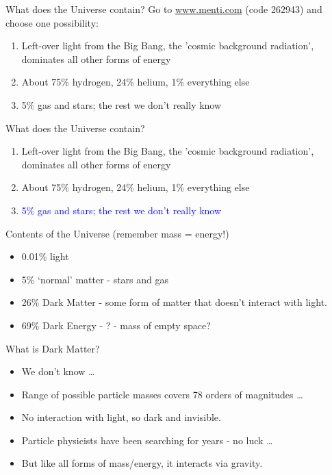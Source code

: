 \documentclass[usenames,dvipsnames]{beamer}
\newcommand{\mentiurl}[0]{{\url{www.menti.com}}}
\newcommand{\menticode}[0]{{262943}}
\newcommand{\mentiinvitation}[0]{Go to \mentiurl{} (code \menticode{}) and choose one possibility:\\}
\newcommand{\correctanswer}[1]{\textcolor{blue}{{#1} \checkmark}}
\begin{document}
\begin{frame}{What does the Universe contain?}
    \mentiinvitation{}
    \begin{enumerate}
      \item{Left-over light from the Big Bang, the 'cosmic background radiation', dominates all other forms of energy}
      \item{About 75\% hydrogen, 24\% helium, 1\% everything else}
      \item{5\% gas and stars; the rest we don't really know}
    \end{enumerate}
\end{frame}


\begin{frame}{What does the Universe contain?}
    \begin{enumerate}
      \item{Left-over light from the Big Bang, the 'cosmic background radiation', dominates all other forms of energy}
      \item{About 75\% hydrogen, 24\% helium, 1\% everything else}
      \item{\correctanswer{5\% gas and stars; the rest we don't really know}}
    \end{enumerate}
\end{frame}


\begin{frame}{Contents of the Universe (remember mass = energy!)}
  \begin{block}{}
    \begin{itemize}
      \item{0.01\% light}
      \item{5\% `normal' matter - stars and gas}
      \item{26\% Dark Matter - some form of matter that doesn't interact with light.}
      \item{69\% Dark Energy - ? - mass of empty space?}
    \end{itemize}
  \end{block}
\end{frame}


\begin{frame}{What is Dark Matter?}
  \begin{block}{}
    \begin{itemize}
      \item{We don't know \ldots}
      \item{Range of possible particle masses covers 78 orders of magnitudes \ldots}
      \item{No interaction with light, so dark and invisible.}
      \item{Particle physicists have been searching for years - no luck \ldots}
      \item{But like all forms of mass/energy, it interacts via gravity.}
    \end{itemize}
  \end{block}
\end{frame}
\end{document}
